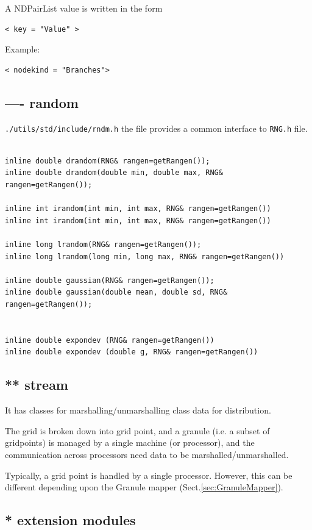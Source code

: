 A NDPairList value is written in the form
\begin{verbatim}
< key = "Value" >
\end{verbatim}
Example:

\begin{verbatim}
< nodekind = "Branches">
\end{verbatim}


\subsection{ ---- random}
\label{sec:random-MGS}

\verb!./utils/std/include/rndm.h!
the file provides a common interface to \verb!RNG.h! file.
\begin{verbatim}

inline double drandom(RNG& rangen=getRangen());
inline double drandom(double min, double max, RNG& rangen=getRangen());

inline int irandom(int min, int max, RNG& rangen=getRangen())
inline int irandom(int min, int max, RNG& rangen=getRangen())

inline long lrandom(RNG& rangen=getRangen());
inline long lrandom(long min, long max, RNG& rangen=getRangen())

inline double gaussian(RNG& rangen=getRangen());
inline double gaussian(double mean, double sd, RNG& rangen=getRangen());


inline double expondev (RNG& rangen=getRangen())
inline double expondev (double g, RNG& rangen=getRangen())

\end{verbatim}


\subsection{ ** stream}
\label{sec:GSL-utility-stream}

It has classes for marshalling/unmarshalling class data for distribution.

The grid is broken down into grid point, and a granule (i.e. a subset of
gridpoints) is managed by a single machine (or processor), and the communication
across processors need data to be marshalled/unmarshalled.

Typically, a grid point is handled by a single processor. However, this can be
different depending upon the Granule mapper (Sect.\ref{sec:GranuleMapper}).


\subsection{* extension modules}
\label{sec:GSL-extension}

